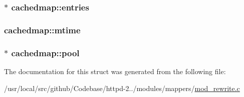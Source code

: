 \subsubsection[{\texorpdfstring{entries}{entries}}]{$\ast$ cachedmap\+::entries}\hypertarget{structcachedmap_a464c75c57c00103d0cff5dac5c5e2fd5}{}\label{structcachedmap_a464c75c57c00103d0cff5dac5c5e2fd5}
\subsubsection[{\texorpdfstring{mtime}{mtime}}]{ cachedmap\+::mtime}\hypertarget{structcachedmap_a28b63a58b43964bcac9591e83096475d}{}\label{structcachedmap_a28b63a58b43964bcac9591e83096475d}
\subsubsection[{\texorpdfstring{pool}{pool}}]{$\ast$ cachedmap\+::pool}\hypertarget{structcachedmap_ab1dc4db2ab8307a7e8c61d872c25c540}{}\label{structcachedmap_ab1dc4db2ab8307a7e8c61d872c25c540}


The documentation for this struct was generated from the following file\+:\begin{DoxyCompactItemize}
\item 
/usr/local/src/github/\+Codebase/httpd-\/2../modules/mappers/\hyperlink{mod__rewrite_8c}{mod\+\_\+rewrite.\+c}\end{DoxyCompactItemize}
